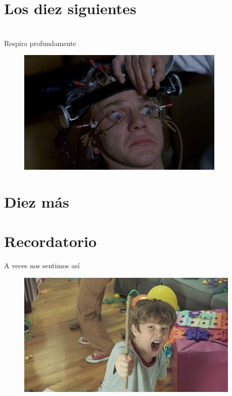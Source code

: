 \documentclass[14pt]{beamer}
\begin{document}
\section{Los diez siguientes}












\section{}

\begin{frame}{}
  \begin{block}{}
    \centering \Large Respira profundamente
  \end{block}

  \begin{figure}
    \centering
    \includegraphics[height=6cm]{pics/a-clockwork-orange-2.jpg}
  \end{figure}
\end{frame}

\section{Diez más}












\section{Recordatorio}
\begin{frame}[fragile]{A veces nos sentimos así}
  \begin{figure}
    \centering
    \includegraphics[height=6cm]{pics/un-palo.jpg}
  \end{figure}
\end{frame}
\end{document}
